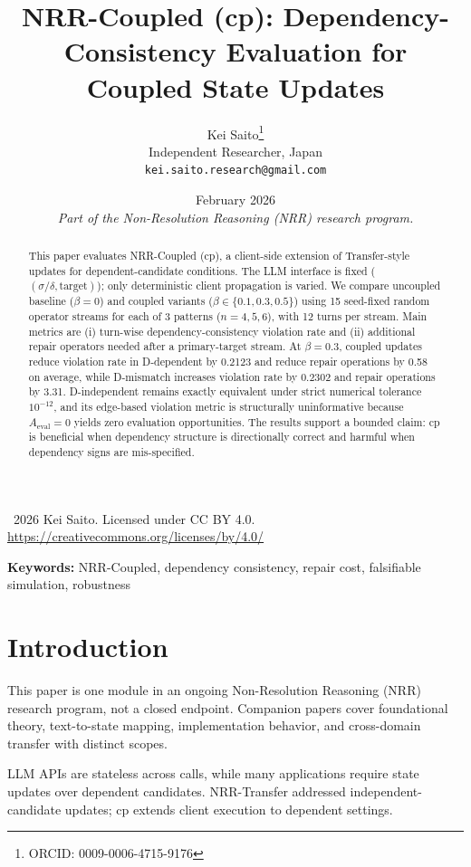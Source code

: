 \documentclass[11pt,a4paper]{article}
\title{\textbf{NRR-Coupled (cp): Dependency-Consistency Evaluation for Coupled State Updates}}
\author{Kei Saito\thanks{ORCID: 0009-0006-4715-9176}\\Independent Researcher, Japan\\\texttt{kei.saito.research@gmail.com}}
\date{February 2026\\[0.5em]\textit{Part of the Non-Resolution Reasoning (NRR) research program.}}
\begin{document}
\maketitle

\begin{center}
\textcopyright\ 2026 Kei Saito. Licensed under CC BY 4.0.\\
\url{https://creativecommons.org/licenses/by/4.0/}
\end{center}

\begin{abstract}
This paper evaluates NRR-Coupled (cp), a client-side extension of Transfer-style updates for dependent-candidate conditions. The LLM interface is fixed (\((\sigma/\delta,\text{target})\)); only deterministic client propagation is varied. We compare uncoupled baseline (\(\beta=0\)) and coupled variants (\(\beta\in\{0.1,0.3,0.5\}\)) using 15 seed-fixed random operator streams for each of 3 patterns (\(n=4,5,6\)), with 12 turns per stream. Main metrics are (i) turn-wise dependency-consistency violation rate and (ii) additional repair operators needed after a primary-target stream. At \(\beta=0.3\), coupled updates reduce violation rate in D-dependent by 0.2123 and reduce repair operations by 0.58 on average, while D-mismatch increases violation rate by 0.2302 and repair operations by 3.31. D-independent remains exactly equivalent under strict numerical tolerance \(10^{-12}\), and its edge-based violation metric is structurally uninformative because \(A_{\text{eval}}=0\) yields zero evaluation opportunities. The results support a bounded claim: cp is beneficial when dependency structure is directionally correct and harmful when dependency signs are mis-specified.
\end{abstract}

\noindent\textbf{Keywords:} NRR-Coupled, dependency consistency, repair cost, falsifiable simulation, robustness

\section{Introduction}
\label{sec:introduction}
This paper is one module in an ongoing Non-Resolution Reasoning (NRR) research program, not a closed endpoint. Companion papers cover foundational theory, text-to-state mapping, implementation behavior, and cross-domain transfer with distinct scopes.

LLM APIs are stateless across calls, while many applications require state updates over dependent candidates. NRR-Transfer addressed independent-candidate updates; cp extends client execution to dependent settings.
\end{document}
